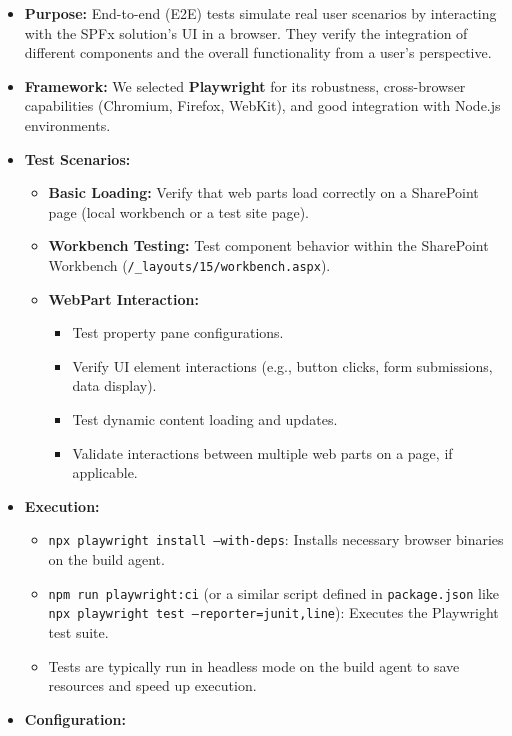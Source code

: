 \begin{itemize}
    \item \textbf{Purpose:} End-to-end (E2E) tests simulate real user scenarios by interacting with the SPFx solution's UI in a browser. They verify the integration of different components and the overall functionality from a user's perspective.
    \item \textbf{Framework:} We selected \textbf{Playwright} for its robustness, cross-browser capabilities (Chromium, Firefox, WebKit), and good integration with Node.js environments.
    \item \textbf{Test Scenarios:}
    \begin{itemize}
        \item \textbf{Basic Loading:} Verify that web parts load correctly on a SharePoint page (local workbench or a test site page).
        \item \textbf{Workbench Testing:} Test component behavior within the SharePoint Workbench (\texttt{/_layouts/15/workbench.aspx}).
        \item \textbf{WebPart Interaction:}
        \begin{itemize}
            \item Test property pane configurations.
            \item Verify UI element interactions (e.g., button clicks, form submissions, data display).
            \item Test dynamic content loading and updates.
            \item Validate interactions between multiple web parts on a page, if applicable.
        \end{itemize}
    \end{itemize}
    \item \textbf{Execution:}
    \begin{itemize}
        \item \texttt{npx playwright install --with-deps}: Installs necessary browser binaries on the build agent.
        \item \texttt{npm run playwright:ci} (or a similar script defined in \texttt{package.json} like \texttt{npx playwright test --reporter=junit,line}): Executes the Playwright test suite.
        \item Tests are typically run in headless mode on the build agent to save resources and speed up execution.
    \end{itemize}
    \item \textbf{Configuration:}

\end{itemize}
